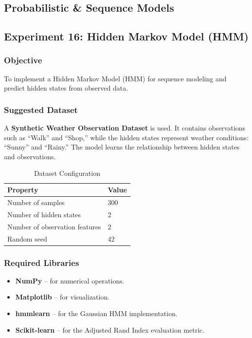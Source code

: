\documentclass[a4paper,11pt]{article}
\begin{document}
\begin{itemize}
\section{Probabilistic \& Sequence Models}

\subsection{Experiment 16: Hidden Markov Model (HMM)}

\subsubsection{Objective}
To implement a Hidden Markov Model (HMM) for sequence modeling and predict hidden states from observed data.

\subsubsection{Suggested Dataset}
A \textbf{Synthetic Weather Observation Dataset} is used. It contains observations such as ``Walk'' and ``Shop,'' while the hidden states represent weather conditions: ``Sunny'' and ``Rainy.'' The model learns the relationship between hidden states and observations.

\begin{table}[H]
\centering
\caption{Dataset Configuration}
\begin{tabular}{ll}
\toprule
\textbf{Property} & \textbf{Value} \\
\midrule
Number of samples       & 300 \\
Number of hidden states & 2 \\
Number of observation features & 2 \\
Random seed             & 42 \\
\bottomrule
\end{tabular}
\end{table}

\subsubsection{Required Libraries}
\begin{itemize}
    \item \textbf{NumPy} -- for numerical operations.
    \item \textbf{Matplotlib} -- for visualization.
    \item \textbf{hmmlearn} -- for the Gaussian HMM implementation.
    \item \textbf{Scikit-learn} -- for the Adjusted Rand Index evaluation metric.
\end{itemize}


\end{itemize}
\end{document}
